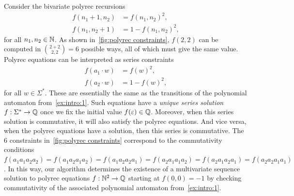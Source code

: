\begin{example}
    \label{ex:intro:2}
    Consider the bivariate polyrec recursions
    \begin{align*}
        f(n_1 + 1, n_2) &= f(n_1, n_2)^2, \\
        f(n_1, n_2 + 1) &= 1 - f(n_1, n_2)^2,
    \end{align*}
    for all $n_1, n_2 \in \mathbb N$.
    As shown in~\cref{fig:polyrec constraints},
    $f(2, 2)$ can be computed in ${2 + 2 \choose 2, 2} = 6$ possible ways,
    all of which must give the same value.
    Polyrec equations can be interpreted as series constraints 
    \begin{align*}
        f(a_1 \cdot w) &= f(w)^2, \\
        f(a_2 \cdot w) &= 1 - f(w)^2,
    \end{align*}
    for all $w \in \Sigma^*$.
    These are essentially the same as the transitions of the polynomial automaton from~\cref{ex:intro:1}.
    Such equations have a \emph{unique series solution} $f : \Sigma^* \to \mathbb Q$
    once we fix the initial value $f(\varepsilon) \in \mathbb Q$.
    Moreover, when this series solution is commutative,
    it will also satisfy the polyrec equations.
    And vice versa, when the polyrec equations have a solution, then this series is commutative.
    The $6$ constraints in~\cref{fig:polyrec constraints} correspond to the commutativity conditions
    $f(a_1 a_1 a_2 a_2) = f(a_1 a_2 a_1 a_2) = f(a_1 a_2 a_2 a_1) = f(a_2 a_1 a_1 a_2) = f(a_2 a_1 a_2 a_1) = f(a_2 a_2 a_1 a_1)$.
    In this way, our algorithm determines the existence of a multivariate sequence solution to polyrec equations $f : \mathbb N^2 \to \mathbb Q$ starting at $f(0, 0) = -1$
    by checking commutativity of the associated polynomial automaton from~\cref{ex:intro:1}.
\end{example}

\newcommand{\thegrid}{
    \draw[step=7mm] (0,0) grid (2,2);
    \foreach \i in {0,...,2}
        \foreach \j in {0,...,2}
            \fill (\i,\j) circle (1pt);
}

